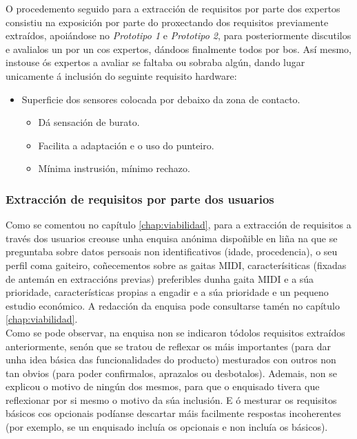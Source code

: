   O procedemento seguido para a extracción de requisitos por parte dos expertos
  consistiu na exposición por parte do proxectando dos requisitos previamente
  extraídos, apoiándose no \textit{Prototipo 1} e \textit{Prototipo 2}, para
  posteriormente discutilos e avalialos un por un cos expertos, dándoos finalmente
  todos por bos. Así mesmo, instouse ós expertos a avaliar se faltaba ou
  sobraba algún, dando lugar unicamente á inclusión do seguinte requisito
  hardware:

  \begin{itemize}
   \item Superficie dos sensores colocada por debaixo da zona de contacto.
         \begin{itemize}
          \item Dá sensación de burato.
          \item Facilita a adaptación e o uso do punteiro.
          \item Mínima instrusión, mínimo rechazo.
         \end{itemize}
  \end{itemize}

  \subsubsection{Extracción de requisitos por parte dos usuarios}

  Como se comentou no capítulo \ref{chap:viabilidad}, para a extracción de
  requisitos a través dos usuarios creouse unha enquisa anónima dispoñible en
  liña \cite{Enquisa} na que se preguntaba sobre datos persoais non
  identificativos (idade, procedencia), o seu perfil coma gaiteiro,
  coñecementos sobre as gaitas MIDI, caracterísiticas (fixadas de antemán en
  extraccións previas) preferibles dunha gaita MIDI e a súa prioridade,
  características propias a engadir e a súa prioridade e un pequeno estudio
  económico. A redacción da enquisa pode consultarse tamén no capítulo
  \ref{chap:viabilidad}. \\

  Como se pode observar, na enquisa non se indicaron tódolos requisitos
  extraídos anteriormente, senón que se tratou de reflexar os máis importantes
  (para dar unha idea básica das funcionalidades do producto) mesturados con
  outros non tan obvios (para poder confirmalos, aprazalos ou desbotalos).
  Ademais, non se explicou o motivo de ningún dos mesmos, para que o enquisado
  tivera que reflexionar por si mesmo o motivo da súa inclusión. E ó mesturar
  os requisitos básicos cos opcionais podíanse descartar máis facilmente
  respostas incoherentes (por exemplo, se un enquisado incluía os opcionais e
  non incluía os básicos). \\

